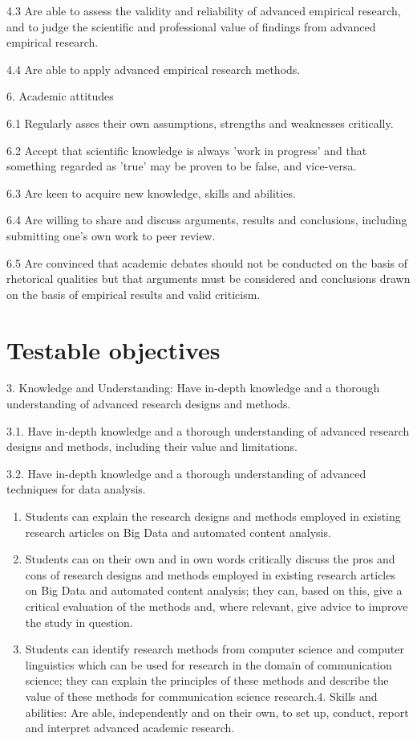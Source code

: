 \documentclass[a4paper,12pt]{report}
\begin{document}
4.3	Are able to assess the validity and reliability of advanced empirical research, and to judge the scientific and professional value of findings from advanced empirical research.


4.4	Are able to apply advanced empirical research methods.


6. Academic attitudes


6.1 	Regularly asses their own assumptions, strengths and weaknesses critically.


6.2	Accept that scientific knowledge is always 'work in progress' and that something regarded as 'true' may be proven to be false, and vice-versa.


6.3 	Are keen to acquire new knowledge, skills and abilities. 


6.4 	Are willing to share and discuss arguments, results and conclusions, including submitting one's own work to peer review. 


6.5 	Are convinced that academic debates should not be conducted on the basis of rhetorical qualities but that arguments must be considered and conclusions drawn on the basis of empirical results and valid criticism.





\chapter{Testable objectives}

{\footnotesize{
3. Knowledge and Understanding: Have in-depth knowledge and a thorough understanding of advanced research designs and methods. 


3.1. Have in-depth knowledge and a thorough understanding of advanced research designs and methods, including their value and limitations.


3.2.	Have in-depth knowledge and a thorough understanding of advanced techniques for data analysis.

}}

\begin{enumerate}[A]
\item Students can explain the research designs and methods employed in existing research articles on Big Data and automated content analysis.
\item Students can on their own and in own words critically discuss the pros and cons of research designs and methods employed in existing research articles on Big Data and automated content analysis; they can, based on this, give a critical evaluation of the methods and, where relevant, give advice to improve the study in question.
\item Students can identify research methods from computer science and computer linguistics which can be used for research in the domain of communication science; they can explain the principles of these methods and describe the value of these methods for communication science research.4. Skills and abilities: Are able, independently and on their own, to set up, conduct, report and interpret advanced academic research.
\end{enumerate}
\end{document}
